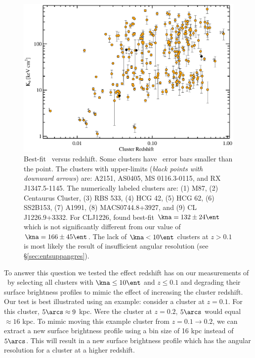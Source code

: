 \begin{figure}[htp]
  \begin{center}
    \begin{minipage}[htp]{\linewidth}
      \includegraphics*[width=\textwidth, trim=5mm 0mm 4mm 5mm, clip]{k0res}
      \caption[Best-fit \kna\ versus redshift.]{Best-fit \kna\ versus
        redshift. Some clusters have \kna\ error bars smaller than the
        point. The clusters with upper-limits ({\it{black points with
        downward arrows}}) are: A2151, AS0405, MS 0116.3-0115, and RX
        J1347.5-1145. The numerically labeled clusters are: (1) M87,
        (2) Centaurus Cluster, (3) RBS 533, (4) HCG 42, (5) HCG 62,
        (6) SS2B153, (7) A1991, (8) MACS0744.8+3927, and (9) CL
        J1226.9+3332. For CLJ1226, \cite{2007ApJ...659.1125M} found
        best-fit $\kna = 132 \pm 24 \ent$ which is not significantly
        different from our value of $\kna = 166 \pm 45 \ent$. The lack
        of $\kna < 10 \ent$ clusters at $z > 0.1$ is most likely the
        result of insufficient angular resolution (see
        \S\ref{sec:entsuppangres}).}
      \label{fig:k0res}
    \end{minipage}
  \end{center}
\end{figure}

To answer this question we tested the effect redshift has on our
measurements of \kna\ by selecting all clusters with $\kna \leq 10
\ent$ and $z \leq 0.1$ and degrading their surface brightness profiles
to mimic the effect of increasing the cluster redshift. Our test is
best illustrated using an example: consider a cluster at $z =
0.1$. For this cluster, $5\arcs \approx 9$ kpc. Were the cluster at
$z = 0.2$, $5\arcs$ would equal $\approx 16$ kpc. To mimic moving
this example cluster from $z = 0.1 \rightarrow 0.2$, we can extract a
new surface brightness profile using a bin size of 16 kpc instead of
$5\arcs$. This will result in a new surface brightness profile which
has the angular resolution for a cluster at a higher redshift.

